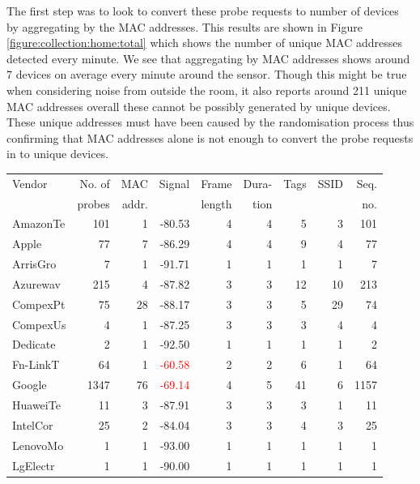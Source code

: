 The first step was to look to convert these probe requests to number of devices by aggregating by the MAC addresses.
This results are shown in Figure \ref{figure:collection:home:total} which shows the number of unique MAC addresses detected every minute.
We see that aggregating by MAC addresses shows around 7 devices on average every minute around the sensor.
Though this might be true when considering noise from outside the room, it also reports around 211 unique MAC addresses overall these cannot be possibly generated by unique devices.
These unique addresses must have been caused by the randomisation process thus confirming that MAC addresses alone is not enough to convert the probe requests in to unique devices.

\begin{table}
\footnotesize
\begin{center}
  \begin{tabular}{lrrrrrrrr}
  \toprule
  Vendor & No. of & MAC & Signal & Frame & Dura-& Tags & SSID & Seq. \\ 
  & probes & addr. &  & length &  tion &  &  & no. \\ 
  \midrule
  AmazonTe &  101 &   1 & -80.53 &   4 &   4 &   5 &   3 & 101 \\ 
  Apple    &   77 &   7 & -86.29 &   4 &   4 &   9 &   4 &  77 \\ 
  ArrisGro &    7 &   1 & -91.71 &   1 &   1 &   1 &   1 &   7 \\ 
  Azurewav &  215 &   4 & -87.82 &   3 &   3 &  12 &  10 & 213 \\ 
  CompexPt &   75 &  28 & -88.17 &   3 &   3 &   5 &  29 &  74 \\ 
  CompexUs &    4 &   1 & -87.25 &   3 &   3 &   3 &   4 &   4 \\ 
  Dedicate &    2 &   1 & -92.50 &   1 &   1 &   1 &   1 &   2 \\ 
  Fn-LinkT &   64 &   1 & \textcolor{red}{-60.58} &   2 &   2 &   6 &   1 &  64 \\ 
  Google   & 1347 &  76 & \textcolor{red}{-69.14} &   4 &   5 &  41 &   6 & 1157 \\ 
  HuaweiTe &   11 &   3 & -87.91 &   3 &   3 &   3 &   1 &  11 \\ 
  IntelCor &   25 &   2 & -84.04 &   3 &   3 &   4 &   3 &  25 \\ 
  LenovoMo &    1 &   1 & -93.00 &   1 &   1 &   1 &   1 &   1 \\ 
  LgElectr &    1 &   1 & -90.00 &   1 &   1 &   1 &   1 &   1 \\ 

\end{tabular}
\end{center}
\end{table}
